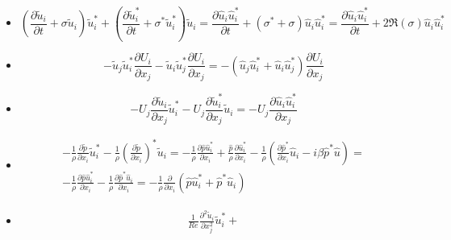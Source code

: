 \documentclass{jfm}
\begin{document}
\begin{itemize}
  \item
  \begin{equation}
    \left( \frac{\partial \tilde{u}_i}{\partial t} + \sigma \tilde{u}_i \right) \tilde{u}_i^* +
    \left( \frac{\partial \tilde{u}_i^*}{\partial t} + \sigma^* \tilde{u}^*_i \right) \tilde{u}_i = 
    \frac{\partial \hat{u}_i \hat{u}^*_i}{\partial t} + ( \sigma^* + \sigma ) \hat{u}_i \hat{u}_i^* = 
    \frac{\partial \hat{u}_i \hat{u}^*_i}{\partial t} + 2 \Re(\sigma) \hat{u}_i \hat{u}_i^* 
  \end{equation}
  \item
  \begin{equation}
    - \tilde{u}_j \tilde{u}_i^* \frac{\partial U_i}{\partial x_j} - 
      \tilde{u}_i \tilde{u}_j^* \frac{\partial U_i}{\partial x_j} = - ( \hat{u}_j \hat{u}_i^* + \hat{u}_i \hat{u}_j^* ) \frac{\partial U_i}{\partial x_j}
  \end{equation}
  \item
  \begin{equation}
    - U_j \frac{\partial \tilde{u}_i}{\partial x_j} \tilde{u}_i^* - U_j \frac{\partial \tilde{u}_i^*}{\partial x_j} \tilde{u}_i = 
    - U_j \frac{\partial \hat{u}_i \hat{u}_i^*}{\partial x_j}
  \end{equation}
  \item
  \begin{equation}
  \begin{gathered}
    - \frac{1}{\rho} \frac{\partial \tilde{p}}{\partial x_i} \tilde{u}_i^* - 
      \frac{1}{\rho} \left( \frac{\partial \tilde{p}}{\partial x_i} \right)^* \tilde{u}_i = 
    - \frac{1}{\rho} \frac{\partial \hat{p} \hat{u}_i^*}{\partial x_i} + \frac{\hat{p}}{\rho} \frac{\partial \hat{u}_i^*}{\partial x_i} - 
    \frac{1}{\rho} \left( \frac{\partial \hat{p}^*}{\partial x_i} \hat{u}_i - i \beta \hat{p}^* \hat{u} \right) = \\
    - \frac{1}{\rho} \frac{\partial \hat{p} \hat{u}_i^*}{\partial x_i} -
      \frac{1}{\rho} \frac{\partial \hat{p}^* \hat{u}_i}{\partial x_i} = 
      - \frac{1}{\rho} \frac{\partial}{\partial x_i} \left(  \hat{p} \hat{u}_i^* + \hat{p}^* \hat{u}_i \right)
  \end{gathered}
  \end{equation}
  \item 
  \begin{equation}
  \begin{gathered}
    \frac{1}{Re} \frac{\partial^2 \tilde{u}_i}{\partial x_j^2} \tilde{u}_i^* +

\end{gathered}
\end{equation}
\end{itemize}
\end{document}
